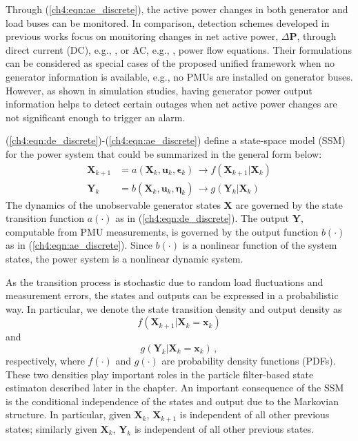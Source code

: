 Through (\ref{ch4:eqn:ae_discrete}), the active power changes in both generator and load buses can be monitored. In comparison, detection schemes developed in previous works focus on monitoring changes in net active power, $\Delta\textbf{P}$, through direct current (DC), e.g., \cite{Chen2016}, or AC, e.g., \cite{yang2020control}, power flow equations. Their formulations can be considered as special cases of the proposed unified framework when no generator information is available, e.g., no PMUs are installed on generator buses. However, as shown in simulation studies, having generator power output information helps to detect certain outages when net active power changes are not significant enough to trigger an alarm.

(\ref{ch4:eqn:de_discrete})-(\ref{ch4:eqn:ae_discrete}) define a state-space model (SSM) for the power system that could be summarized in the general form below:
\begin{subequations}
\label{ch4:eqn:general_ssm}
\begin{align}
\boldsymbol{X}_{k+1} &= a(\boldsymbol{X}_{k}, \boldsymbol{u}_{k}, \boldsymbol{\epsilon}_{k}) \, \rightarrow f(\boldsymbol{X}_{k+1}|\boldsymbol{X}_{k}) \\ 
\boldsymbol{Y}_{k} &= b(\boldsymbol{X}_{k}, \boldsymbol{u}_{k}, \boldsymbol{\eta}_{k}) \, \rightarrow g(\boldsymbol{Y}_{k} | \boldsymbol{X}_{k})
\end{align}
\end{subequations}
The dynamics of the unobservable generator states $\boldsymbol{X}$ are governed by the state transition function $a(\cdot)$ as in (\ref{ch4:eqn:de_discrete}). The output $\boldsymbol{Y}$, computable from PMU measurements, is governed by the output function $b(\cdot)$ as in (\ref{ch4:eqn:ae_discrete}). Since $b(\cdot)$ is a nonlinear function of the system states, the power system is a nonlinear dynamic system.

As the transition process is stochastic due to random load fluctuations and measurement errors, the states and outputs can be expressed in a probabilistic way. In particular, we denote the state transition density and output density as 
$$
f(\boldsymbol{X}_{k+1}|\boldsymbol{X}_{k}=\boldsymbol{x}_{k})
$$ 
and 
$$
g(\boldsymbol{Y}_{k} |\boldsymbol{X}_{k}=\boldsymbol{x}_{k}) \,,
$$
respectively, where $f(\cdot)$ and $g(\cdot)$ are probability density functions (PDFs). These two densities play important roles in the particle filter-based state estimaton described later in the chapter. An important consequence of the SSM is the conditional independence of the states and output due to the Markovian structure. In particular, given $\boldsymbol{X}_{k}$, $\boldsymbol{X}_{k+1}$ is independent of all other previous states; similarly given $\boldsymbol{X}_{k}$, $\boldsymbol{Y}_{k}$ is independent of all other previous states.


